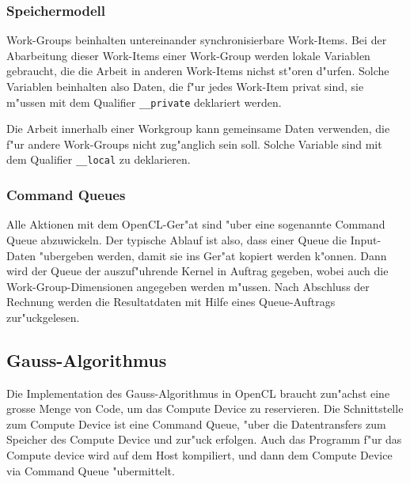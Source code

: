 \subsubsection{Speichermodell}
Work-Groups beinhalten untereinander synchronisierbare Work-Items.
Bei der Abarbeitung dieser Work-Items einer Work-Group werden
lokale Variablen gebraucht,
die die Arbeit in anderen Work-Items nichst st"oren d"urfen.
Solche Variablen beinhalten also Daten, die f"ur jedes Work-Item
privat sind, sie m"ussen mit dem Qualifier \verb+__private+
deklariert werden.

Die Arbeit innerhalb einer Workgroup kann gemeinsame Daten verwenden,
die f"ur andere Work-Groups nicht zug"anglich sein soll.
Solche Variable sind mit dem Qualifier \verb+__local+ zu
deklarieren.

\subsubsection{Command Queues}
Alle Aktionen mit dem OpenCL-Ger"at sind "uber eine sogenannte
Command Queue abzuwickeln. Der typische Ablauf ist also, dass einer
Queue die Input-Daten "ubergeben werden, damit sie ins Ger"at
kopiert werden k"onnen. Dann wird der Queue der auszuf"uhrende
Kernel in Auftrag gegeben, wobei auch die Work-Group-Dimensionen
angegeben werden m"ussen. Nach Abschluss der Rechnung werden die
Resultatdaten mit Hilfe eines Queue-Auftrags zur"uckgelesen.

\subsection{Gauss-Algorithmus}
Die Implementation des Gauss-Algorithmus in OpenCL braucht zun"achst eine
grosse Menge von Code, um das Compute Device zu reservieren.
Die Schnittstelle zum Compute Device ist eine Command Queue,
"uber die Datentransfers zum Speicher des Compute Device und zur"uck
erfolgen.
Auch das Programm f"ur das Compute device wird auf dem
Host kompiliert, und dann dem Compute Device via Command Queue
"ubermittelt.

